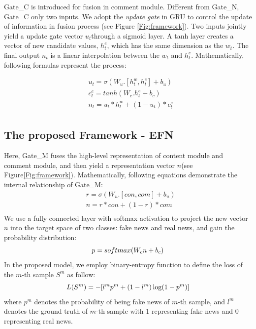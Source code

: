 \documentclass{article}
\newcommand{\m}{EFN}
\begin{document}
	Gate\_C is introduced for fusion in comment module. Different from Gate\_N, Gate\_C only two inputs. We adopt the \textit{update gate} in GRU to control the update of information in fusion process (see Figure \ref{Fig:framework}). Two inputs jointly yield a update gate vector $u_t$through a sigmoid layer. A tanh layer creates a vector of new candidate values, $h_t^e$, which has the same dimension as the $w_t$. The final output $n_t$ is a linear interpolation between the $w_t$ and $h_t^e$. Mathematically, following formulas represent the process:
	
	\begin{equation}
	\begin{aligned}
	&u_t = \sigma(W_u.[h^w_t, h^e_t] + b_u)\\
	&c_t^e = tanh(W_c.h^e_t + b_c)\\
	&n_t = u_t*h^w_t + (1-u_t)*c_t^e\\
	\end{aligned}
	\end{equation}
	
	\subsection{The proposed Framework - {\m}}
	Here, Gate\_M fuses the high-level representation of content module and comment module, and then yield a representation vector $n$(see Figure\ref{Fig:framework}). Mathematically, following equations demonstrate the internal relationship of Gate\_M: 
	\begin{equation}
	\begin{aligned}
	&r = \sigma(W_u.[con, com] + b_u)\\
	&n = r*con + (1-r)*com\\
	\end{aligned}
	\end{equation}
	We use a fully connected layer with softmax activation to project the new vector $n$ into the target space of two classes: fake news and real news, and gain the probability distribution:
	\begin{equation}
	\centering
	p = softmax(W_cn+b_c)
	\end{equation}
	In the proposed model, we employ binary-entropy function to define the loss of the $m$-th sample $S^m$ as follow:
	\begin{equation}
	\centering
	L(S^m) = -[l^mp^m + (1-l^m)\log(1-p^m)]
	\end{equation}
	where $p^m$ denotes the probability of being fake news of $m$-th sample, and $l^m$ denotes the ground truth of $m$-th sample with 1 representing fake news and 0 representing real news. 
	
\end{document}
